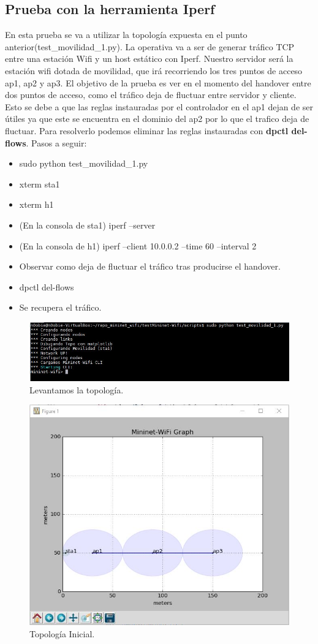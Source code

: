 \subsection{Prueba con la herramienta Iperf}
En esta prueba se va a utilizar la topología expuesta en el punto anterior(test\_movilidad\_1.py). La operativa va a ser de generar tráfico TCP  entre una estación Wifi y un host estático con Iperf. Nuestro servidor será la estación wifi dotada de movilidad, que irá recorriendo los tres puntos de acceso ap1, ap2  y ap3. \newline
\newline
El objetivo de la prueba es ver en el momento del handover entre dos puntos de acceso, como el tráfico deja de fluctuar entre servidor y cliente. Esto se debe a que las reglas instauradas por el controlador en el ap1 dejan de ser útiles ya que este se encuentra en el dominio del ap2 por lo que el trafico deja de fluctuar. Para resolverlo podemos eliminar las reglas instauradas con \textbf{dpctl del-flows}. Pasos a seguir:
\begin{itemize}
    \item sudo python test\_movilidad\_1.py
    \item xterm sta1
    \item xterm h1
    \item (En la consola de sta1) iperf --server
    \item (En la consola de h1) iperf --client 10.0.0.2 --time 60 --interval 2
    \item Observar como deja de fluctuar el tráfico tras producirse el handover.
    \item dpctl del-flows
    \item Se recupera el tráfico.
\end{itemize}
\newpage
\begin{figure}[!htb]
  \centering
    \includegraphics[width=0.8\linewidth]{./img/21.JPG}
    \caption{Levantamos la topología.}
  \label{fig:yo}
\end{figure}
\begin{figure}[!htb]
  \centering
    \includegraphics[width=0.6\linewidth]{./img/22.JPG}
    \caption{Topología Inicial.}
  \label{fig:yo}
\end{figure}
